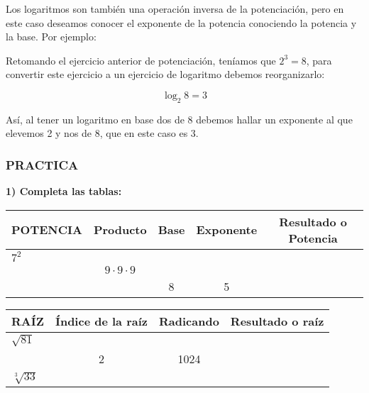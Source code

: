 \documentclass[12pt,a4paper]{article}
\begin{document}
\vspace{0.5cm}

\begin{tcolorbox}[colback=fondorosa,colframe=rojoclaro,title=\textbf{Los logaritmos},fonttitle=\bfseries,breakable]

Los logaritmos son también una operación inversa de la potenciación, pero en este caso deseamos conocer el exponente de la potencia conociendo la potencia y la base. Por ejemplo:

Retomando el ejercicio anterior de potenciación, teníamos que $2^3 = 8$, para convertir este ejercicio a un ejercicio de logaritmo debemos reorganizarlo:

$$\log_2 8 = 3$$

Así, al tener un logaritmo en base dos de 8 debemos hallar un exponente al que elevemos 2 y nos de 8, que en este caso es 3.

\end{tcolorbox}


\vspace{1cm}

\subsubsection*{PRACTICA}

\textbf{1) Completa las tablas:}

\vspace{0.5cm}

\begin{center}
\begin{tabular}{|l|c|c|c|c|}
\hline
\cellcolor{fondoazul}\textbf{POTENCIA} & \textbf{Producto} & \textbf{Base} & \textbf{Exponente} & \textbf{Resultado o Potencia} \\
\hline
$7^2$ & & & & \\
\hline
& $9 \cdot 9 \cdot 9$ & & & \\
\hline
& & 8 & 5 & \\
\hline
\end{tabular}
\end{center}

\vspace{0.5cm}

\begin{center}
\begin{tabular}{|l|c|c|c|}
\hline
\cellcolor{fondoazul}\textbf{RAÍZ} & \textbf{Índice de la raíz} & \textbf{Radicando} & \textbf{Resultado o raíz} \\
\hline
$\sqrt{81}$ & & & \\
\hline
& 2 & 1024 & \\
\hline
$\sqrt[3]{33}$ & & & \\
\hline
\end{tabular}
\end{center}
\end{document}
